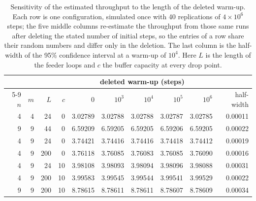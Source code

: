 \begin{table}[!htbp]
\centering
\caption{Sensitivity of the estimated throughput to the length of the deleted warm-up.
Each row is one configuration, simulated once with 40 replications of $4\times10^{6}$
steps; the five middle columns re-estimate the throughput from those same runs after
deleting the stated number of initial steps, so the entries of a row share their random
numbers and differ only in the deletion. The last column is the half-width of the 95\%
confidence interval at a warm-up of $10^{4}$. Here $L$ is the length of the feeder loops
and $c$ the buffer capacity at every drop point.}
\label{tab:warmup_sensitivity}
\footnotesize
\begin{tabular}{rrrr rrrrr r}
\toprule
 & & & & \multicolumn{5}{c}{deleted warm-up (steps)} & \\
\cmidrule(lr){5-9}
$n$ & $m$ & $L$ & $c$ & $0$ & $10^{3}$ & $10^{4}$ & $10^{5}$ & $10^{6}$ & half-width \\
\midrule
4 & 4 &  24 &  0 & 3.02789 & 3.02788 & 3.02788 & 3.02787 & 3.02785 & 0.00011 \\
9 & 9 &  44 &  0 & 6.59209 & 6.59205 & 6.59205 & 6.59206 & 6.59205 & 0.00022 \\
4 & 9 &  24 &  0 & 3.74421 & 3.74416 & 3.74416 & 3.74418 & 3.74412 & 0.00019 \\
4 & 9 & 200 &  0 & 3.76118 & 3.76085 & 3.76083 & 3.76085 & 3.76090 & 0.00016 \\
4 & 9 &  24 & 10 & 3.98108 & 3.98093 & 3.98094 & 3.98096 & 3.98088 & 0.00031 \\
4 & 9 & 200 & 10 & 3.99583 & 3.99545 & 3.99544 & 3.99541 & 3.99529 & 0.00022 \\
9 & 9 & 200 & 10 & 8.78615 & 8.78611 & 8.78611 & 8.78607 & 8.78609 & 0.00034 \\
\bottomrule
\end{tabular}
\end{table}
